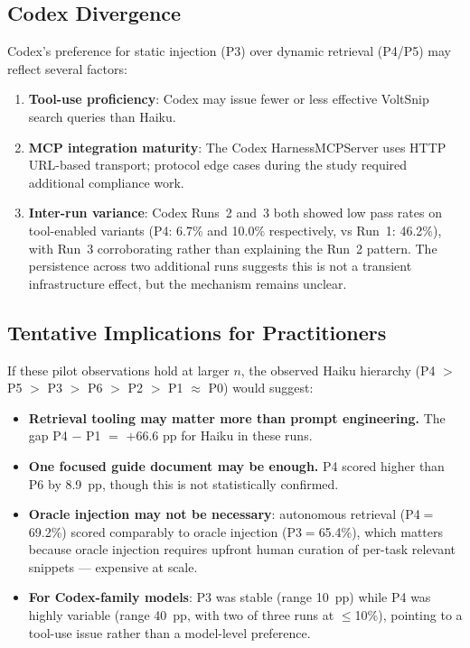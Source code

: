 \documentclass[10pt,a4paper,twocolumn]{article}
\begin{document}
\subsection{Codex Divergence}
\label{sec:codex-divergence}

Codex's preference for static injection (P3) over dynamic retrieval
(P4/P5) may reflect several factors:

\begin{enumerate}
    \item \textbf{Tool-use proficiency}: Codex may issue fewer or less
    effective VoltSnip search queries than Haiku.
    \item \textbf{MCP integration maturity}: The Codex HarnessMCPServer
    uses HTTP URL-based transport; protocol edge cases during the study
    required additional compliance work.
    \item \textbf{Inter-run variance}: Codex Runs~2 and~3 both showed low
    pass rates on tool-enabled variants (P4: 6.7\% and 10.0\%
    respectively, vs Run~1: 46.2\%), with Run~3 corroborating rather
    than explaining the Run~2 pattern. The persistence across two
    additional runs suggests this is not a transient infrastructure
    effect, but the mechanism remains unclear.
\end{enumerate}

\subsection{Tentative Implications for Practitioners}
\label{sec:implications}

If these pilot observations hold at larger $n$, the observed Haiku
hierarchy (P4 $>$ P5 $>$ P3 $>$ P6 $>$ P2 $>$ P1 $\approx$ P0) would
suggest:

\begin{itemize}
    \item \textbf{Retrieval tooling may matter more than prompt
    engineering.} The gap P4 $-$ P1 $=$ $+$66.6 pp for Haiku in these
    runs.
    \item \textbf{One focused guide document may be enough.} P4 scored
    higher than P6 by 8.9~pp, though this is not statistically confirmed.
    \item \textbf{Oracle injection may not be necessary}: autonomous
    retrieval (P4$=$69.2\%) scored comparably to oracle injection
    (P3$=$65.4\%), which matters because oracle injection requires upfront
    human curation of per-task relevant snippets --- expensive at scale.
    \item \textbf{For Codex-family models}: P3 was stable (range 10~pp)
    while P4 was highly variable (range 40~pp, with two of three runs at
    $\leq$10\%), pointing to a tool-use issue rather than a model-level
    preference.
\end{itemize}
\end{document}

